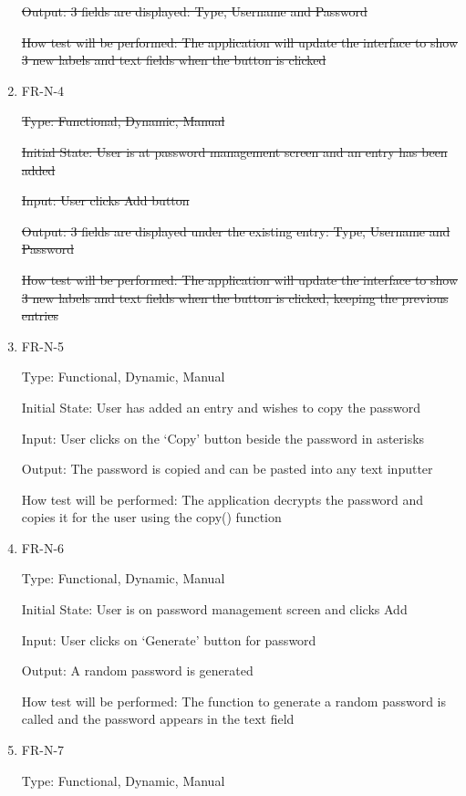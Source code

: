 \documentclass[12pt, titlepage]{article}
\begin{document}
\begin{enumerate}
\sout{Output: 3 fields are displayed: Type, Username and Password}

\sout{How test will be performed: The application will update the interface to show 3 new labels and text fields when the button is clicked}

\item{FR-N-4\\}

\sout{Type: Functional, Dynamic, Manual}

\sout{Initial State: User is at password management screen and an entry has been added}

\sout{Input: User clicks Add button}

\sout{Output: 3 fields are displayed under the existing entry: Type, Username and Password}

\sout{How test will be performed: The application will update the interface to show 3 new labels and text fields when the button is clicked, keeping the previous entries}

\item{FR-N-5\\}

Type: Functional, Dynamic, Manual

Initial State: User has added an entry and wishes to copy the password

Input: User clicks on the ‘Copy’ button beside the password in asterisks

Output: The password is copied and can be pasted into any text inputter

How test will be performed: The application decrypts the password and copies it for the user using the copy() function

\item{FR-N-6\\}

Type: Functional, Dynamic, Manual

Initial State: User is on password management screen and clicks Add

Input: User clicks on ‘Generate’ button for password

Output: A random password is generated

How test will be performed: The function to generate a random password is called and the password appears in the text field

\item{FR-N-7\\}

Type: Functional, Dynamic, Manual


\end{enumerate}
\end{document}
